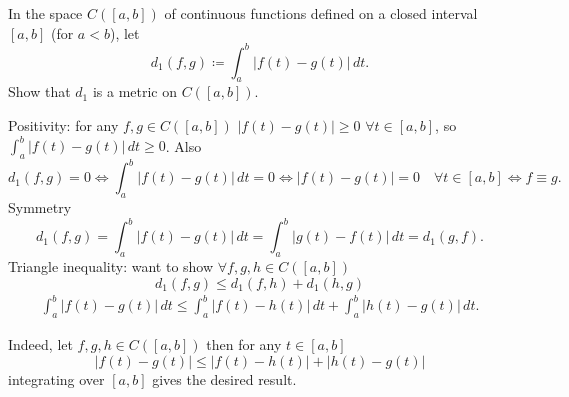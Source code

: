 \documentclass[10pt, a4paper]{article}
\begin{document}
\begin{problem}
    In the space $C([a, b])$ of continuous functions defined on a closed interval $[a, b]$
    (for $a < b$),
    let
    \[
    d_1(f, g) \coloneqq \int_{a}^{b}|f(t) - g(t)|\,dt.
    \]
    Show that $d_1$ is a metric on $C([a, b])$.

    \begin{solution}
        Positivity:
        for any $f, g \in C([a, b])$ $|f(t) - g(t)| \geq 0$ $\forall t \in [a, b]$,
        so $\int_{a}^{b}|f(t) - g(t)|\,dt \geq 0$.
        Also
        \[
        d_1(f, g) = 0 \iff \int_{a}^{b}|f(t) - g(t)|\,dt = 0 \iff |f(t) - g(t)| = 0 \quad \forall t \in [a, b] \iff f \equiv g.
        \]
        Symmetry
        \[
        d_1(f, g) = \int_{a}^{b}|f(t) - g(t)|\,dt = \int_{a}^{b}|g(t) - f(t)|\,dt = d_1(g, f).
        \]
        Triangle inequality:
        want to show $\forall f, g, h \in C([a, b])$
        \[
        d_1(f, g) \leq d_1(f, h) + d_1(h, g)
        \]
        \begin{align*}
            \int_{a}^{b}|f(t) - g(t)|\,dt \leq \int_{a}^{b}|f(t) - h(t)|\,dt + \int_{a}^{b}|h(t) - g(t)|\,dt.
        \end{align*}

        Indeed,
        let $f, g, h \in C([a, b])$ then for any $t \in [a, b]$
        \[
        |f(t) - g(t)| \leq |f(t) - h(t)| + |h(t) - g(t)|
        \]
        integrating over $[a, b]$ gives the desired result.
    \end{solution}
\end{problem}
\end{document}
